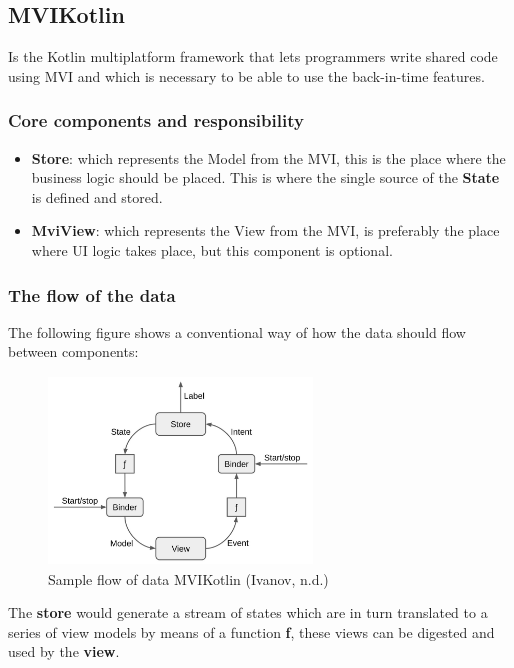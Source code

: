 \subsection{MVIKotlin}

Is the Kotlin multiplatform framework that lets programmers write shared code using MVI and which is necessary to be able to use the back-in-time features.

\subsubsection{Core components and responsibility}

\begin{itemize}
   \item \textbf{Store}: which represents the Model from the MVI, this is the place where the business logic should be placed. This is where the single source of the \textbf{State} is defined and stored.
  	\item \textbf{MviView}: which represents the View from the MVI, is preferably the place where UI logic takes place, but this component is optional.
\end{itemize}

\subsubsection{The flow of the data}

The following figure shows a conventional way of how the data should flow between components:

\begin{figure}[h]
\centering
\includegraphics[height=5cm,width=7cm]{figures/flowdata}
\caption{Sample flow of data MVIKotlin (Ivanov, n.d.)}
\label{fig: Sample flow of data MVIKotlin}
\end{figure}

The \textbf{store} would generate a stream of states which are in turn translated to a series of view models by means of a function \textbf{f}, these views can be digested and used by the \textbf{view}.

